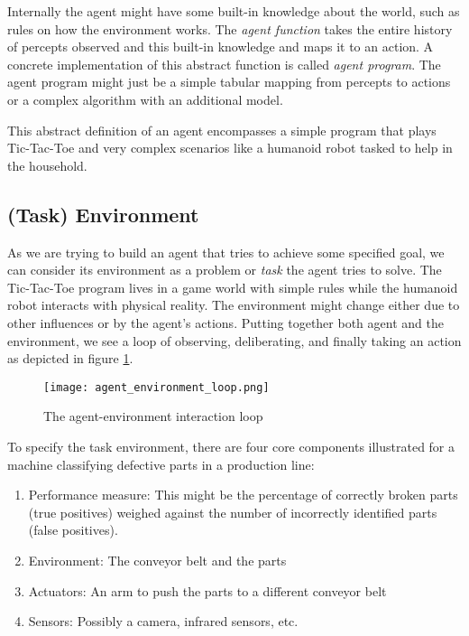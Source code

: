 Internally the agent might have some built-in knowledge about the world, such as rules on how the environment works. The \textit{agent function} takes the entire history of percepts observed and this built-in knowledge and maps it to an action. A concrete implementation of this abstract function is called \textit{agent program}. The agent program might just be a simple tabular mapping from percepts to actions or a complex algorithm with an additional model.

This abstract definition of an agent encompasses a simple program that plays Tic-Tac-Toe and very complex scenarios like a humanoid robot tasked to help in the household.

\subsection{(Task) Environment}
\label{environment}

As we are trying to build an agent that tries to achieve some specified goal, we can consider its environment as a problem or \textit{task} the agent tries to solve. The Tic-Tac-Toe program lives in a game world with simple rules while the humanoid robot interacts with physical reality. The environment might change either due to other influences or by the agent's actions. Putting together both agent and the environment, we see a loop of observing, deliberating, and finally taking an action as depicted in figure \ref{agent_environment_loop}.

\begin{figure}
    \centering
    \texttt{[image: agent\_environment\_loop.png]}
    \caption{The agent-environment interaction loop \cite[cf. p. 96]{russell_artificial_2021}}
    \label{agent_environment_loop}
\end{figure}

To specify the task environment, there are four core components illustrated for a machine classifying defective parts in a production line:

\begin{enumerate}
    \item Performance measure: This might be the percentage of correctly broken parts (true positives) weighed against the number of incorrectly identified parts (false positives).
    \item Environment: The conveyor belt and the parts
    \item Actuators: An arm to push the parts to a different conveyor belt
    \item Sensors: Possibly a camera, infrared sensors, etc.
\end{enumerate}

